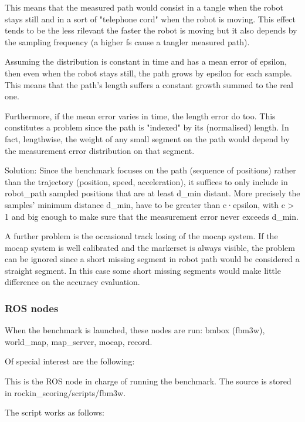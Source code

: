 \documentclass[a4paper]{article}
\begin{document}
This means that the measured path would consist in a tangle when the robot stays still and in a sort of "telephone cord" when the robot is moving.
This effect tends to be the less rilevant the faster the robot is moving but it also depends by the sampling frequency (a higher fs cause a tangler measured path).

Assuming the distribution is constant in time and has a mean error of epsilon,
then even when the robot stays still, the path grows by epsilon for each sample.
This means that the path's length suffers a constant growth summed to the real one.

Furthermore, if the mean error varies in time, the length error do too.
This constitutes a problem since the path is "indexed" by its (normalised) length.
In fact, lengthwise, the weight of any small segment on the path would depend by the measurement error distribution on that segment.
 
Solution:
Since the benchmark focuses on the path (sequence of positions) rather than the trajectory (position, speed, acceleration), it suffices to only include in robot_path sampled positions that are at least d_min distant.
More precisely the samples' minimum distance d_min, have to be greater than c·epsilon, with c > 1 and big enough to make sure that the measurement error never exceeds d_min.

A further problem is the occasional track losing of the mocap system. If the mocap system is well calibrated and the markerset is always visible, the problem can be ignored since a short missing segment in robot path would be considered a straight segment. In this case some short missing segments would make little difference on the accuracy evaluation.


\subsubsection{ROS nodes}

When the benchmark is launched, these nodes are run: bmbox (fbm3w), world\_map, map\_server, mocap, record.

Of special interest are the following:

\label{sec:fbm3w_benchmark_node}

This is the ROS node in charge of running the benchmark.
The source is stored in rockin\_scoring/scripts/fbm3w.

The script works as follows:
\end{document}
